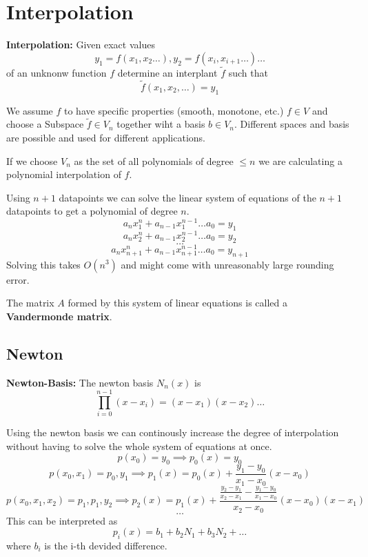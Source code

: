 \section{Interpolation}

\begin{definition}
    \textbf{Interpolation:} Given exact values 
    $$y_1 = f(x_1,x_2\dots), y_2 = f(x_i, x_{i+1} \dots) \dots$$
    of an unknonw function $f$ determine an interplant $\tilde{f}$ such that 
    $$\tilde{f}(x_1, x_2, \dots) = y_1$$
\end{definition}

\begin{remark}
    We assume $f$ to have specific properties (smooth, monotone, etc.) $f \in V$ and choose a Subspace $\tilde{f} \in V_n$ together wiht a basis $b \in V_n$. Different spaces and basis are possible and used for different applications.
\end{remark}

\begin{example}
    If we choose $V_n$ as the set of all polynomials of degree $\le n$ we are calculating a polynomial interpolation of $f$.
\end{example}

\begin{example}
    Using $n+1$ datapoints we can solve the linear system of equations of the $n+1$ datapoints to get a polynomial of degree $n$.
    $$a_n x_1^n + a_{n-1} x_1^{n-1} \dots a_0 = y_1$$
    $$a_n x_2^n + a_{n-1} x_2^{n-1} \dots a_0 = y_2$$
    $$\dots$$
    $$a_n x_{n+1}^n + a_{n-1} x_{n+1}^{n-1} \dots a_0 = y_{n+1}$$
    Solving this takes $O(n^3)$ and might come with unreasonably large rounding error.
\end{example}

\begin{definition}
    The matrix $A$ formed by this system of linear equations is called a \textbf{Vandermonde matrix}.
\end{definition}

\subsection{Newton}

\begin{definition}
    \textbf{Newton-Basis:} The newton basis $N_n(x)$ is 
    $$\prod_{i=0}^{n-1} (x-x_i) = (x-x_1) (x-x_2) \dots$$
\end{definition}

\begin{theorem}
    Using the newton basis we can continously increase the degree of interpolation without having to solve the whole system of equations at once.
    $$p(x_0) = y_0 \implies p_0(x) = y_0$$
    $$p(x_0, x_1) = p_0, y_1 \implies p_1(x) = p_0(x) + \frac{y_1 - y_0}{x_1 - x_0} (x - x_0)$$
    $$p(x_0, x_1, x_2) = p_1, p_1, y_2 \implies p_2(x) = p_1(x) + \frac{\frac{y_2 - y_1}{x_2 - x_1} - \frac{y_1 - y_0}{x_1 - x_0}}{x_2 - x_0} (x - x_0)(x - x_1)$$
    $$\dots$$
    This can be interpreted as 
    $$p_i(x) = b_1 + b_2 N_1 + b_3 N_2 + \dots$$
    where $b_i$ is the i-th devided difference.
\end{theorem}

